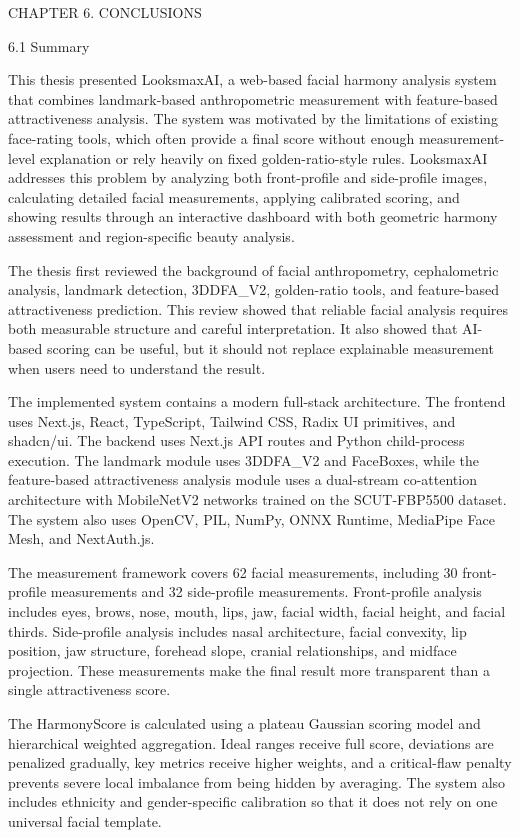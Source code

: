 CHAPTER 6. CONCLUSIONS

6.1  Summary

This thesis presented LooksmaxAI, a web-based facial harmony analysis system that combines landmark-based anthropometric measurement with feature-based attractiveness analysis. The system was motivated by the limitations of existing face-rating tools, which often provide a final score without enough measurement-level explanation or rely heavily on fixed golden-ratio-style rules. LooksmaxAI addresses this problem by analyzing both front-profile and side-profile images, calculating detailed facial measurements, applying calibrated scoring, and showing results through an interactive dashboard with both geometric harmony assessment and region-specific beauty analysis.

The thesis first reviewed the background of facial anthropometry, cephalometric analysis, landmark detection, 3DDFA_V2, golden-ratio tools, and feature-based attractiveness prediction. This review showed that reliable facial analysis requires both measurable structure and careful interpretation. It also showed that AI-based scoring can be useful, but it should not replace explainable measurement when users need to understand the result.

The implemented system contains a modern full-stack architecture. The frontend uses Next.js, React, TypeScript, Tailwind CSS, Radix UI primitives, and shadcn/ui. The backend uses Next.js API routes and Python child-process execution. The landmark module uses 3DDFA_V2 and FaceBoxes, while the feature-based attractiveness analysis module uses a dual-stream co-attention architecture with MobileNetV2 networks trained on the SCUT-FBP5500 dataset. The system also uses OpenCV, PIL, NumPy, ONNX Runtime, MediaPipe Face Mesh, and NextAuth.js.

The measurement framework covers 62 facial measurements, including 30 front-profile measurements and 32 side-profile measurements. Front-profile analysis includes eyes, brows, nose, mouth, lips, jaw, facial width, facial height, and facial thirds. Side-profile analysis includes nasal architecture, facial convexity, lip position, jaw structure, forehead slope, cranial relationships, and midface projection. These measurements make the final result more transparent than a single attractiveness score.

The HarmonyScore is calculated using a plateau Gaussian scoring model and hierarchical weighted aggregation. Ideal ranges receive full score, deviations are penalized gradually, key metrics receive higher weights, and a critical-flaw penalty prevents severe local imbalance from being hidden by averaging. The system also includes ethnicity and gender-specific calibration so that it does not rely on one universal facial template.

